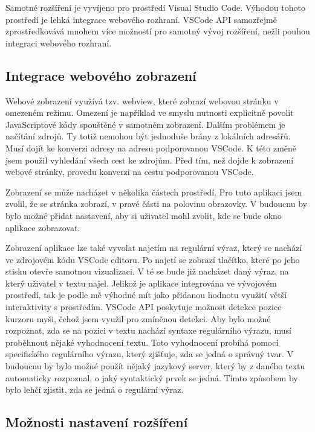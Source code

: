 Samotné rozšíření je vyvíjeno pro prostředí Visual Studio Code.
Výhodou tohoto prostředí je lehká integrace webového rozhraní.
VSCode API samozřejmě zprostředkovává mnohem více možností pro samotný vývoj rozšíření, nežli pouhou integraci webového rozhraní.

\subsection*{Integrace webového zobrazení}

Webové zobrazení využívá tzv. webview, které zobrazí webovou stránku v omezeném režimu.
Omezení je například ve smyslu nutnosti explicitně povolit JavaScriptové kódy spouštěné v samotném zobrazení.
Dalším problémem je načítání zdrojů.
Ty totiž nemohou být jednoduše brány z lokálních adresářů. 
Musí dojít ke konverzi adresy na adresu podporovanou VSCode. 
K této změně jsem použil vyhledání všech cest ke zdrojům.
Před tím, než dojde k zobrazení webové stránky, provedu konverzi na cestu podporovanou VSCode.

Zobrazení se může nacházet v několika částech prostředí.
Pro tuto aplikaci jsem zvolil, že se stránka zobrazí, v pravé části na polovinu obrazovky.
V budoucnu by bylo možné přidat nastavení, aby si uživatel mohl zvolit, kde se bude okno aplikace zobrazovat.

Zobrazení aplikace lze také vyvolat najetím na regulární výraz, který se nachází ve zdrojovém kódu VSCode editoru.
Po najetí se zobrazí tlačítko, které po jeho stisku otevře samotnou vizualizaci.
V té se bude již nacházet daný výraz, na který uživatel v textu najel.
Jelikož je aplikace integrována ve vývojovém prostředí, tak je podle mě výhodné mít jako přidanou hodnotu využití větší interaktivity s prostředím.
VSCode API poskytuje možnost detekce pozice kurzoru myši, čehož jsem využil pro zmíněnou detekci.
Aby bylo možné rozpoznat, zda se na pozici v textu nachází syntaxe regulárního výrazu, musí proběhnout nějaké vyhodnocení textu.
Toto vyhodnocení probíhá pomocí specifického regulárního výrazu, který zjišťuje, zda se jedná o správný tvar.
V budoucnu by bylo možné použít nějaký jazykový server, který by z daného textu automaticky rozpoznal, o jaký syntaktický prvek se jedná.
Tímto způsobem by bylo lehčí zjistit, zda se jedná o regulární výraz.

\subsection*{Možnosti nastavení rozšíření}

